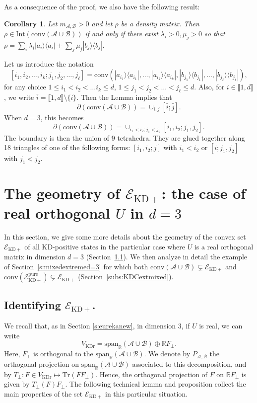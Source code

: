 \documentclass[a4paper, notitlepage, 11pt]{article}
\numberwithin{equation}{section}
\newcommand{\Acal}{{\mathcal A}}
\newcommand{\Bcal}{{\mathcal B}}
\newcommand{\EcalKDC}{{\mathcal E}_{\mathrm{KD+}}}
\newcommand{\EcalKDCpu}{{\mathcal E}_{\mathrm{KD+}}^{\mathrm{pure}}}
\newcommand{\spanRAB}{{\mathrm{span}_{\R}(\Acal\cup\Bcal)}}
\newcommand{\R}{\mathbb{R}}
\newcommand{\mab}{m_{\Acal,\Bcal}}
\newcommand{\conv}[1]{\mathrm{conv}\left(#1\right)}
\newcommand{\VR}{V_{\mathrm{KDr}}}
\newcommand{\convAB}{\conv{\Acal \cup \Bcal}}
\newtheorem{Cor}[Theorem]{Corollary}
\begin{document}
As a consequence of the proof, we also have the following result:
\begin{Cor}\label{cor:intconvAB}
Let $\mab>0$ and let $\rho$ be a density matrix. Then $\rho\in\mathrm{Int}(\convAB)$ if and only if there exist $\lambda_i>0, \mu_j>0$ so that
$\rho=\sum_i \lambda_i |a_i\rangle\langle a_i|+ \sum_j \mu_j |b_j\rangle\langle b_j|.$
\end{Cor}
Let us introduce the notation
$$
[i_1,i_2,\dots,i_k;j_1,j_2,\dots,j_{\ell}]=\conv{|a_{i_1}\rangle\langle a_{i_1}|,\dots,|a_{i_k}\rangle\langle a_{i_k}|, |b_{j_1}\rangle\langle b_{j_1}|, \dots, |b_{j_\ell}\rangle\langle b_{j_\ell}|},
$$
for any choice $1\leq i_1<i_2<\dots i_k\leq d$, $1\leq j_1<j_2<\dots <j_\ell\leq d$. Also, for $i\in \llbracket 1,d\rrbracket$, we write $\bar i =\llbracket 1,d\rrbracket\setminus \{i\}$. Then the Lemma implies that
$$
\partial(\convAB)=\cup_{i,j} [\bar i; \bar j].
$$
When $d=3$, this becomes
$$
\partial(\convAB)=\cup_{i_1<i_2;j_1<j_2} [i_1, i_2;j_1, j_2].
$$
The boundary is then the union of $9$ tetrahedra. They are glued together along 18 triangles of one of the following forms:  $[i_1, i_2; j]$ with $i_1 < i_2$ or $[i; j_1, j_2]$ with  $j_1 < j_2$.

\section{The geometry of $\EcalKDC$: the case of real orthogonal $U$ in $d=3$}
In this section, we give some more details about the geometry of the convex set $\EcalKDC$ of all KD-positive states in the particular case where $U$ is a real orthogonal matrix in dimension $d=3$ (Section~\ref{s:d3general}). 
We then analyze in detail the   example of Section~\ref{s:mixedextremed=3} for which both $\convAB \subsetneq \EcalKDC$ and $\mathrm{conv}(\EcalKDCpu) \subsetneq \EcalKDC$ (Section~\ref{subs:KDCextmixed}).  

\subsection{Identifying $\EcalKDC$.}\label{s:d3general}
We recall that, as in Section \ref{s:eurekanew}, in dimension 3, if $U$ is real, we can write
$$
\VR = \spanRAB\oplus \R F_{\perp}.
$$ 
Here, $F_{\perp}$ is orthogonal to the  $\spanRAB$.  We denote by $P_{\Acal,\Bcal}$ the orthogonal projection on  $\spanRAB$ associated to this decomposition, and by $T_{\perp} : F\in \VR \mapsto\mathrm{Tr}(F F_{\perp})$. Hence, the orthogonal projection of $F$ on $\R F_{\perp}$ is given by $T_{\perp}(F)F_{\perp}$. The following technical lemma and proposition collect the main properties of the set $\EcalKDC$ in this particular situation.
\end{document}
